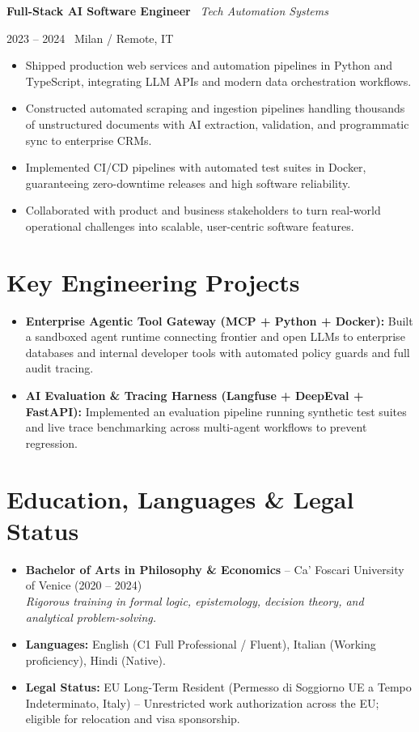 \documentclass[a4paper,10pt]{article}
\newcommand{\role}[4]{%
  \vspace{2pt}\noindent
  \begin{minipage}[t]{0.70\textwidth}\raggedright\textbf{#1} \textbullet\ \textit{#3}\end{minipage}%
  \hfill
  \begin{minipage}[t]{0.28\textwidth}\raggedleft\footnotesize\color{gray}#2 \textbullet\ #4\end{minipage}%
  \vspace{1pt}%
}
\begin{document}
\vspace{3pt}
\role{Full-Stack AI Software Engineer}{2023 -- 2024}{Tech Automation Systems}{Milan / Remote, IT}
\begin{itemize}
  \item Shipped production web services and automation pipelines in Python and TypeScript, integrating LLM APIs and modern data orchestration workflows.
  \item Constructed automated scraping and ingestion pipelines handling thousands of unstructured documents with AI extraction, validation, and programmatic sync to enterprise CRMs.
  \item Implemented CI/CD pipelines with automated test suites in Docker, guaranteeing zero-downtime releases and high software reliability.
  \item Collaborated with product and business stakeholders to turn real-world operational challenges into scalable, user-centric software features.
\end{itemize}

\section{Key Engineering Projects}
\begin{itemize}
  \item \textbf{Enterprise Agentic Tool Gateway (MCP + Python + Docker):} Built a sandboxed agent runtime connecting frontier and open LLMs to enterprise databases and internal developer tools with automated policy guards and full audit tracing.
  \item \textbf{AI Evaluation \& Tracing Harness (Langfuse + DeepEval + FastAPI):} Implemented an evaluation pipeline running synthetic test suites and live trace benchmarking across multi-agent workflows to prevent regression.
\end{itemize}

\section{Education, Languages \& Legal Status}
\begin{itemize}
  \item \textbf{Bachelor of Arts in Philosophy \& Economics} -- Ca' Foscari University of Venice (2020 -- 2024) \\
  \textit{Rigorous training in formal logic, epistemology, decision theory, and analytical problem-solving.}
  \item \textbf{Languages:} English (C1 Full Professional / Fluent), Italian (Working proficiency), Hindi (Native).
  \item \textbf{Legal Status:} EU Long-Term Resident (Permesso di Soggiorno UE a Tempo Indeterminato, Italy) -- Unrestricted work authorization across the EU; eligible for relocation and visa sponsorship.
\end{itemize}
\end{document}
